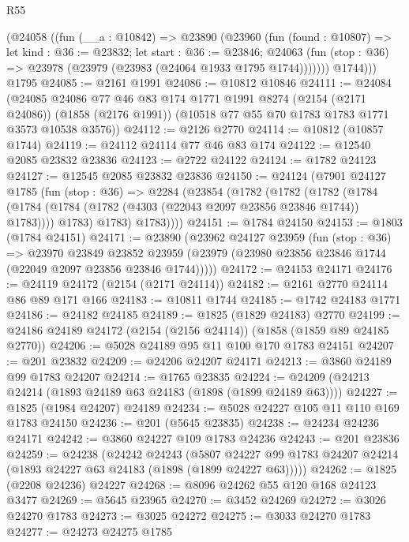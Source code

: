 \begin{lexlean}{R55}
\begin{coremodule}
      (@24058
        ((fun (__a : @10842) =>
        @23890
          (@23960
            (fun (found : @10807) =>
            let kind : @36 := @23832;
            let start : @36 := @23846;
            @24063 (fun (stop : @36) => @23978 (@23979 (@23983 (@24064 @1933 @1795 @1744)))))))
          @1744)))
    @1795
@24085 := @2161 @1991
@24086 := @10812 @10846
@24111 := @24084
    (@24085
      @24086
      @77
      @46
      @83
      @174
      @1771
      @1991
      @8274
      (@2154 (@2171 @24086))
      (@1858 (@2176 @1991))
      (@10518 @77 @55 @70 @1783 @1783 @1771 @3573 @10538 @3576))
@24112 := @2126 @2770
@24114 := @10812 (@10857 @1744)
@24119 := @24112 @24114 @77 @46 @83 @174
@24122 := @12540 @2085 @23832 @23836
@24123 := @2722 @24122
@24124 := @1782 @24123
@24127 := @12545 @2085 @23832 @23836
@24150 := @24124
    (@7901
      @24127
      @1785
      (fun (stop : @36) =>
      @2284
        (@23854
          (@1782
            (@1782
              (@1782
                (@1784 (@1784 (@1784 (@1782 (@4303 (@22043 @2097 @23856 @23846 @1744)) @1783))))
                @1783)
              @1783)
            @1783))))
@24151 := @1784 @24150
@24153 := @1803 (@1784 @24151)
@24171 := @23890
    (@23962
      @24127
      @23959
      (fun (stop : @36) =>
      @23970
        @23849
        @23852
        @23959
        (@23979 (@23980 @23856 @23846 @1744 (@22049 @2097 @23856 @23846 @1744)))))
@24172 := @24153 @24171
@24176 := @24119 @24172 (@2154 (@2171 @24114))
@24182 := @2161 @2770 @24114 @86 @89 @171 @166
@24183 := @10811 @1744
@24185 := @1742 @24183 @1771
@24186 := @24182 @24185
@24189 := @1825 (@1829 @24183) @2770
@24199 := @24186 @24189 @24172 (@2154 (@2156 @24114)) (@1858 (@1859 @89 @24185 @2770))
@24206 := @5028 @24189 @95 @11 @100 @170 @1783 @24151
@24207 := @201 @23832
@24209 := @24206 @24207 @24171
@24213 := @3860 @24189 @99 @1783 @24207
@24214 := @1765 @23835
@24224 := @24209 (@24213 @24214 (@1893 @24189 @63 @24183 (@1898 (@1899 @24189 @63))))
@24227 := @1825 (@1984 @24207) @24189
@24234 := @5028 @24227 @105 @11 @110 @169 @1783 @24150
@24236 := @201 (@5645 @23835)
@24238 := @24234 @24236 @24171
@24242 := @3860 @24227 @109 @1783 @24236
@24243 := @201 @23836
@24259 := @24238
    (@24242
      @24243
      (@5807 @24227 @99 @1783 @24207 @24214 (@1893 @24227 @63 @24183 (@1898 (@1899 @24227 @63)))))
@24262 := @1825 (@2208 @24236) @24227
@24268 := @8096 @24262 @55 @120 @168 @24123 @3477
@24269 := @5645 @23965
@24270 := @3452 @24269
@24272 := @3026 @24270 @1783
@24273 := @3025 @24272
@24275 := @3033 @24270 @1783
@24277 := @24273 @24275 @1785

\end{coremodule}
\end{lexlean}

